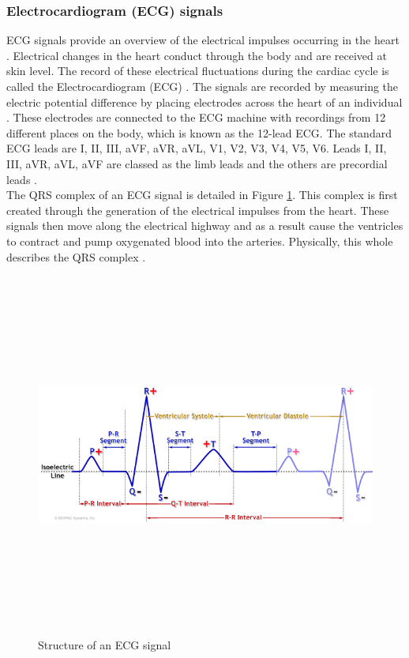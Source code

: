  \subsubsection{Electrocardiogram (ECG) signals} 
 ECG signals provide an overview of the electrical impulses occurring in the 
 heart \cite{Simjanoska20181}. Electrical changes in the heart conduct
  through the body and are received at skin level. The record of these
   electrical fluctuations during the cardiac cycle is called the 
   Electrocardiogram (ECG) \cite{Kumar2015}. The signals are recorded 
   by measuring the electric potential difference by placing electrodes 
   across the heart of an individual \cite{Tanveer2018} \cite{Simjanoska20181}. 
   These electrodes are connected to the ECG machine with recordings from 12 
   different places on the body, which is known as the 12-lead ECG. The standard 
   ECG leads are I, II, III, aVF, aVR, aVL, V1, V2, V3, V4, V5, V6. Leads I, II, 
   III, aVR, aVL, aVF are classed as the limb leads and the others are 
   precordial leads \cite{Tanveer2018}. \\ \newline \noindent The QRS complex 
   of an ECG signal is detailed in Figure \ref{qrs}. This complex is first 
   created through the generation of the electrical impulses from the heart. 
   These signals then move along the electrical highway and as a result cause 
   the ventricles to contract and pump oxygenated blood into the arteries. 
   Physically, this whole describes the QRS 
   complex \cite{Kumar2015}. \begin{figure}[H]
    \centering
    \includegraphics[width=12cm,height=12cm,keepaspectratio]{Background/qrs.png}
    \caption{Structure of an ECG signal \cite{ecgWiki} \cite{qrsWiki}}
    \label{qrs}
\end{figure}



